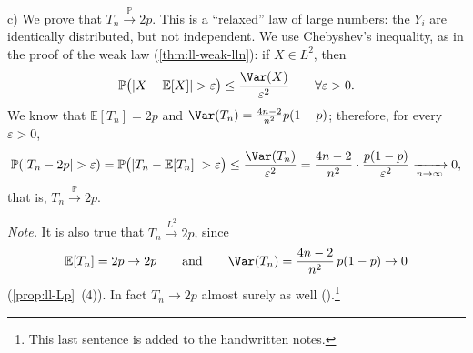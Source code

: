 \begin{example}
c) We prove that $T_n\xrightarrow{\mathbb P}2p$. This is a ``relaxed'' law of large numbers:
the $Y_i$ are identically distributed, but not independent. We use Chebyshev's inequality, as
in the proof of the weak law (\cref{thm:ll-weak-lln}): if $X\in L^2$, then
\[
  \mathbb P\big(|X-\mathbb E[X]|>\varepsilon\big)\le\frac{\Var(X)}{\varepsilon^2}\qquad\forall\varepsilon>0 .
\]
We know that $\mathbb E[T_n]=2p$ and $\Var(T_n)=\frac{4n-2}{n^2}p(1-p)$; therefore, for every
$\varepsilon>0$,
\[
  \mathbb P(|T_n-2p|>\varepsilon)=\mathbb P\big(|T_n-\mathbb E[T_n]|>\varepsilon\big)
  \le\frac{\Var(T_n)}{\varepsilon^2}=\frac{4n-2}{n^2}\cdot\frac{p(1-p)}{\varepsilon^2}
  \xrightarrow[n\to\infty]{}0 ,
\]
that is, $T_n\xrightarrow{\mathbb P}2p$.

\emph{Note.} It is also true that $T_n\xrightarrow{L^2}2p$, since
\[
  \mathbb E[T_n]=2p\to2p\qquad\text{and}\qquad\Var(T_n)=\frac{4n-2}{n^2}\,p(1-p)\to0
\]
(\cref{prop:ll-Lp}~(4)). In fact $T_n\to2p$ almost surely as well
().\footnote{This last sentence is added to the handwritten notes.}
\end{example}

